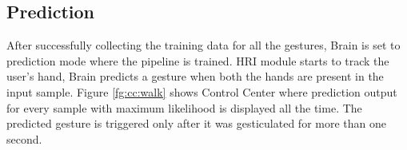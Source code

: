 \subsection{Prediction} After successfully collecting the training data for all the gestures, Brain is set to prediction mode where the pipeline is trained. HRI module starts to track the user's hand, Brain predicts a gesture when both the hands are present in the input sample. Figure \ref{fg:cc:walk} shows Control Center where prediction output for every sample with maximum likelihood is displayed all the time. The predicted gesture is triggered only after it was gesticulated for more than one second.


